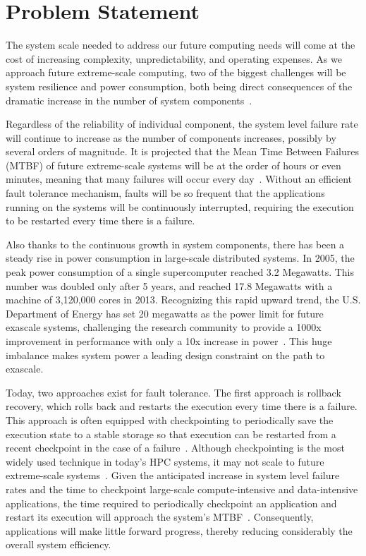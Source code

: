 \section{Problem Statement}

The system scale needed to address our future computing needs will come at the cost of increasing complexity, unpredictability, 
and operating expenses. As we approach future extreme-scale computing, two of the biggest challenges will be system resilience and power 
consumption, both being direct consequences of the dramatic increase in the number of system components~\cite{exa_challenge_2010,snir2014addressing}. 

Regardless of the reliability of individual component, the system level failure rate will continue to increase as the number of 
components increases, possibly by several orders of magnitude. It is projected that the Mean Time Between Failures (MTBF) of future extreme-scale systems will be at the order of hours or even minutes, meaning 
that many failures will occur every day~\cite{Bergman08exascalecomputing}. Without an efficient fault tolerance mechanism, faults will be so frequent that the applications running on the 
systems will be continuously interrupted, requiring the execution to be restarted every time there is a failure. 

Also thanks to the continuous growth in system components, there has been a steady rise in power consumption in large-scale distributed systems. 
In 2005, the peak power consumption of a single supercomputer reached 3.2 Megawatts. This number was doubled only after 5 years, and reached 17.8 
Megawatts with a machine of 3,120,000 cores in 2013. Recognizing this rapid upward trend, the U.S. Department of Energy has set 20 
megawatts as the power limit for future exascale systems, 
challenging the research community to provide a 1000x improvement in performance with only a 10x increase in power~\cite{exa_challenge_2010}. 
This huge imbalance makes system power a leading design constraint on the path to exascale. 

Today, two approaches exist for fault tolerance. The first approach is rollback recovery, which rolls back and restarts the execution 
every time there is a failure. This approach is often equipped with checkpointing to periodically save the execution state to a 
stable storage so that execution can be restarted from a recent checkpoint in the case of a failure~\cite{Elnozahy:02:Survey,kalaiselvi_sadhana_2000,Chandy:1985:DSD:214451.214456}. 
Although checkpointing is the most widely used technique in today's HPC systems, it may not scale to 
future extreme-scale systems~\cite{ferreira_sc_2011,elnozahy_dsc_2004,4367962}. Given the anticipated increase in system level failure rates and the time to checkpoint large-scale 
compute-intensive and data-intensive applications, the time required to periodically checkpoint an application 
and restart its execution will approach the system's MTBF~\cite{Cappello:2009:TER:1640402.1640428}. Consequently, applications will make little forward progress, thereby 
reducing considerably the overall system efficiency. 

